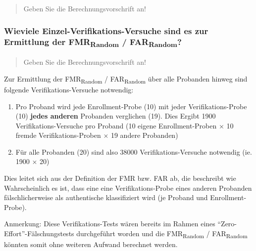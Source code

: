 \documentclass{article}
\newcommand{\annotation}[1]{
    \begin{quote}
    	\begin{textit}{#1}\end{textit}
    \end{quote}
}
\begin{document}
\annotation{Geben Sie die Berechnungsvorschrift an!}

\subsubsection{Wieviele Einzel-Verifikations-Versuche sind es zur Ermittlung der FMR\textsubscript{Random} / FAR\textsubscript{Random}?}

\annotation{Geben Sie die Berechnungsvorschrift an!}

Zur Ermittlung der FMR\textsubscript{Random} / FAR\textsubscript{Random} über alle Probanden hinweg sind folgende Verifikations-Versuche notwendig:

\begin{enumerate}
	\item Pro Proband wird jede Enrollment-Probe (10) mit jeder Verifikations-Probe (10) \textbf{jedes anderen} Probanden verglichen (19). Dies Ergibt 1900 Verifikations-Versuche pro Proband (10 eigene Enrollment-Proben $\times$ 10 fremde Verifikations-Proben $\times$ 19 andere Probanden)
	\item Für alle Probanden (20) sind also 38000 Verifikations-Versuche notwendig (ie. 1900 $\times$ 20)
\end{enumerate}

Dies leitet sich aus der Definition der FMR bzw. FAR ab, die beschreibt wie Wahrscheinlich es ist, dass 
eine eine Verifikations-Probe eines anderen Probanden fälschlicherweise als authentische klassifiziert 
wird (je Proband und Enrollment-Probe).

Anmerkung: Diese Verifikations-Tests wären bereits im Rahmen eines ``Zero-Effort''-Fälschungstests 
durchgeführt worden und die FMR\textsubscript{Random} / FAR\textsubscript{Random} könnten somit ohne 
weiteren Aufwand berechnet werden.
\end{document}

